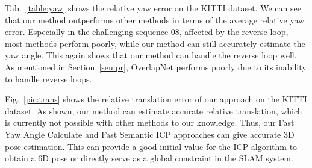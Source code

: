 \documentclass[letterpaper, 10 pt, conference]{ieeeconf}  %
\begin{document}
Tab.~\ref{table:yaw} shows the relative yaw error on the KITTI dataset. We can see that our method outperforms other methods in terms of the average relative yaw error. Especially in the challenging sequence 08, affected by the reverse loop, most methods perform poorly, while our method can still accurately estimate the yaw angle. This again shows that our method can handle the reverse loop well. As mentioned in Section~\ref{seu:pr}, OverlapNet performs poorly due to its inability to handle reverse loops.

Fig.~\ref{pic:trans} shows the relative translation error of our approach on the KITTI dataset. As shown, our method can estimate accurate relative translation, which is currently not possible with other methods to our knowledge. Thus, our Fast Yaw Angle Calculate and Fast Semantic ICP approaches can give accurate 3D pose estimation. This can provide a good initial value for the ICP algorithm to obtain a 6D pose or directly serve as a global constraint in the SLAM system. 


\end{document}
